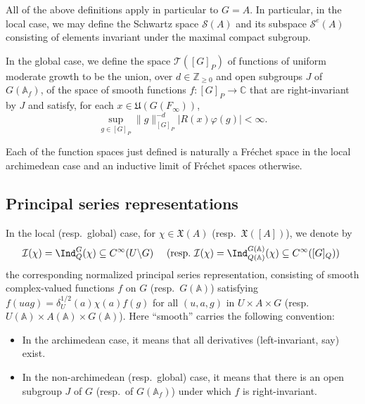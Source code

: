 All of the above definitions apply in particular to $G = A$.  In particular, in the local case, we may define the Schwartz space $\mathcal{S}(A)$ and its subspace $\mathcal{S}^e(A)$ consisting of elements invariant under the maximal compact subgroup.  

In the global case, we define the space $\mathcal{T}([G]_P)$ of functions of uniform moderate growth to be the union, over $d \in \mathbb{Z}_{\geq 0}$ and open subgroups $J$ of $G(\mathbb{A}_f)$, of the space of smooth functions $f : [G]_P \rightarrow \mathbb{C}$ that are right-invariant by $J$ and satisfy, for each $x \in \mathfrak{U}(G(F_\infty))$,
\begin{equation*}
  \sup_{g \in [G]_P} \|g\|^{-d}_{[G]_P} | R(x) \varphi(g)| < \infty.
\end{equation*}

Each of the function spaces just defined is naturally a Fr{\'e}chet space in the local archimedean case and an inductive limit of Fr{\'e}chet spaces otherwise.


\subsection{Principal series representations}\label{sec:induc-repr}
In the local (resp.\ global) case, for $\chi \in \mathfrak{X}(A)$ (resp.\ $\mathfrak{X}([A])$), we denote by 
\begin{equation*}
  \mathcal{I}(\chi) = \Ind_Q^G(\chi) \subseteq C^\infty(U \backslash G)
  \quad
  \text{
    (resp.\ $\mathcal{I}(\chi) = \Ind_{Q(\mathbb{A})}^{G(\mathbb{A})}(\chi) \subseteq C^\infty([G]_Q)$)
  }
\end{equation*}
the corresponding normalized principal series representation, consisting of smooth complex-valued functions $f$ on $G$ (resp.\ $G(\mathbb{A})$) satisfying $f(u a g) = \delta_U^{1/2}(a) \chi(a) f(g)$ for all $(u,a,g)$ in $U \times A \times G$ (resp.\ $U(\mathbb{A}) \times A(\mathbb{A}) \times G(\mathbb{A})$).  Here ``smooth'' carries the following convention:
\begin{itemize}
\item In the archimedean case, it means that all derivatives (left-invariant, say) exist.
\item In the non-archimedean (resp.\ global) case, it means that there is an open subgroup $J$ of $G$ (resp.\ of $G(\mathbb{A}_f)$) under which $f$ is right-invariant.
\end{itemize}

